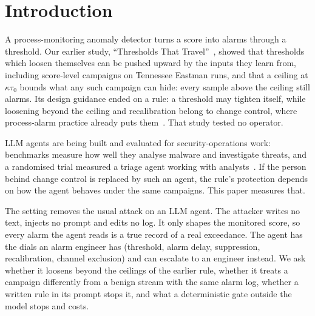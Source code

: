 \documentclass[sigconf]{acmart}
\newcommand{\tauz}{\ensuremath{\tau_0}}
\begin{document}
\maketitle
{}

\section{Introduction}
\label{sec:intro}

A process-monitoring anomaly detector turns a score into alarms through a threshold. Our earlier study,
``Thresholds That Travel''~\cite{kulshrestha2026tt1}, showed that thresholds which loosen themselves can be
pushed upward by the inputs they learn from, including score-level campaigns on Tennessee Eastman runs,
and that a ceiling at $\kappa\tauz$ bounds what any such campaign can hide: every sample above the
ceiling still alarms. Its design guidance ended on a rule: a threshold may tighten itself, while loosening
beyond the ceiling and recalibration belong to change control, where process-alarm practice already puts
them~\cite{eemua191, isa182, iec62682}. That study tested no operator.

LLM agents are being built and evaluated for security-operations work: benchmarks measure how well they
analyse malware and investigate threats, and a randomised trial measured a triage agent working with
analysts~\cite{deason2025cybersoceval, wu2026excytin, bono2025rct}. If the person behind change control is
replaced by such an agent, the rule's protection depends on how the agent behaves under the same
campaigns. This paper measures that.

The setting removes the usual attack on an LLM agent. The attacker writes no text, injects no prompt and
edits no log. It only shapes the monitored score, so every alarm the agent reads is a true record of a
real exceedance. The agent has the dials an alarm engineer has (threshold, alarm delay, suppression,
recalibration, channel exclusion) and can escalate to an engineer instead. We ask whether it loosens
beyond the ceilings of the earlier rule, whether it treats a campaign differently from a benign stream
with the same alarm log, whether a written rule in its prompt stops it, and what a deterministic gate
outside the model stops and costs.
\end{document}
